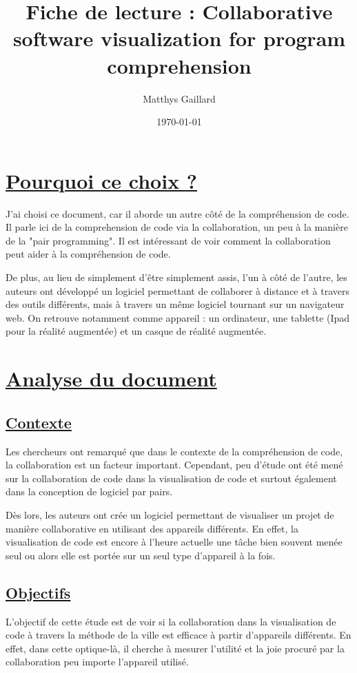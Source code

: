 \documentclass[a4paper,10pt, oneside]{article}
\title{Fiche de lecture : Collaborative software visualization for program comprehension}
\author{Matthys Gaillard}
\date{\today}
\newcommand{\li}{\newline}
\begin{document}
\maketitle
\section{\ul{Pourquoi ce choix ?}}
		\par J'ai choisi ce document\cite{A1}, car il aborde un autre côté de la compréhension de code. Il parle ici de la comprehension de code via la collaboration,
		un peu à la manière de la "pair programming". Il est intéressant de voir comment la collaboration peut aider à la compréhension de code.\li
		\par De plus, au lieu de simplement d'être simplement assis, l'un à côté de l'autre, les auteurs ont développé un logiciel 
		permettant de collaborer à distance et à travers des outils différents, mais à travers un même logiciel tournant sur un navigateur web.
		On retrouve notamment comme appareil : un ordinateur, une tablette (Ipad pour la réalité augmentée) et un casque de réalité augmentée.

\section{\ul{Analyse du document}}
\subsection{\ul{Contexte}}
		\par Les chercheurs ont remarqué que dans le contexte de la compréhension de code, la collaboration est un facteur important. Cependant,
		peu d'étude ont été mené sur la collaboration de code dans la visualisation de code et surtout également dans la conception de logiciel par pairs.\li 
		\par Dès lors, les auteurs ont crée un logiciel permettant de visualiser un projet de manière collaborative en utilisant des appareils différents. En effet, la visualisation de code est encore
		à l'heure actuelle une tâche bien souvent menée seul ou alors elle est portée sur un seul type d'appareil à la fois.
\subsection{\ul{Objectifs}}
		\par L'objectif de cette étude est de voir si la collaboration dans la visualisation de code à travers la méthode de la ville est efficace à partir d'appareils différents.
		En effet, dans cette optique-là, il cherche à mesurer l'utilité et la joie procuré par la collaboration peu importe l'appareil utilisé.
\end{document}
